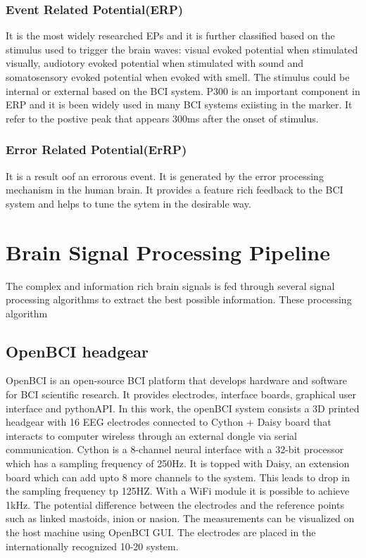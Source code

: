     \subsubsection{Event Related Potential(ERP)}
It is the most widely researched EPs and it is further classified based on the stimulus used to trigger the brain waves: visual evoked potential when stimulated visually,
audiotory evoked potential when stimulated with sound and somatosensory evoked potential when evoked with smell. The stimulus could be internal or external based on the BCI 
system. P300 is an important component in ERP and it is been widely used in many BCI systems exiisting in the marker. It refer to the postive peak that appears 300ms after the 
onset of stimulus.

    \subsubsection{Error Related Potential(ErRP)}
It is a result oof an errorous event. It is generated by the error processing mechanism in the human brain. It provides a feature rich feedback to the BCI system and helps to
tune the sytem in the desirable way.

\section{Brain Signal Processing Pipeline}
The complex and information rich brain signals is fed through several signal processing algorithms to extract the best possible information. These processing algorithm 


\subsection{OpenBCI headgear}
    OpenBCI is an open-source BCI platform that develops hardware and software for BCI scientific research. It provides electrodes, interface boards, graphical user interface 
and pythonAPI. In this work, the openBCI system consists a 3D printed headgear with 16 EEG electrodes connected to Cython + Daisy board that interacts to computer wireless 
through an external dongle via 
serial communication. Cython is a 8-channel neural interface with a 32-bit processor which has a sampling frequency of 250Hz. It is topped with Daisy, an extension board which 
can add upto 8 more channels to the system. This leads to drop in the sampling frequency tp 125HZ. With a WiFi module it is possible to achieve 1kHz.
The potential difference between the electrodes and the reference points such as 
linked mastoids, inion or nasion. The measurements can be visualized on the host machine using OpenBCI GUI. The electrodes are placed in the internationally recognized 10-20 system.

